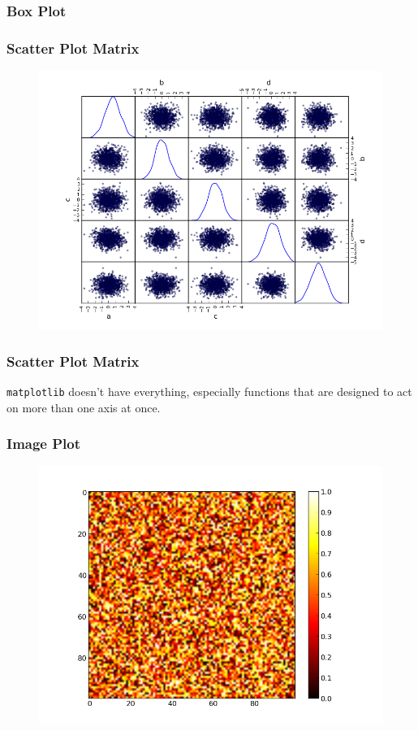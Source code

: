 \documentclass{beamer}
\begin{document}
\begin{frame}
\frametitle{Box Plot}
\end{frame}


\begin{frame}
\frametitle{Scatter Plot Matrix}
\begin{figure}[h]
\centering
\includegraphics[width=.9\textwidth]{images/scattermatrix.png}
\end{figure}
\end{frame}


\begin{frame}
\frametitle{Scatter Plot Matrix}
\texttt{matplotlib} doesn't have everything, especially functions that are designed to act on more than one axis at once. 
\end{frame}

\begin{frame}
\frametitle{Image Plot}
\begin{figure}[h]
\centering
\includegraphics[width=.9\textwidth]{images/imageplot.png}
\end{figure}
\end{frame}
\end{document}
